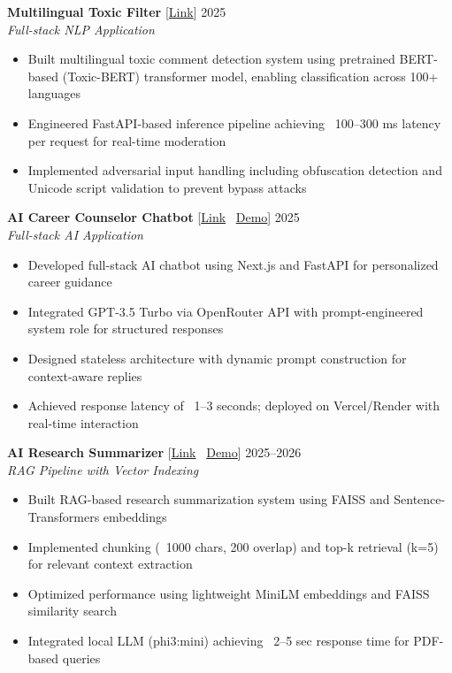 \documentclass[10pt,letterpaper]{article}
\begin{document}
\textbf{Multilingual Toxic Filter} [\href{https://github.com/PRakshithReddy17/multilingual-toxic-filter}{Link}] \hfill 2025\\
\textit{Full-stack NLP Application}
\begin{itemize}
    \item Built multilingual toxic comment detection system using pretrained BERT-based (Toxic-BERT) transformer model, enabling classification across 100+ languages
    \item Engineered FastAPI-based inference pipeline achieving ~100--300 ms latency per request for real-time moderation
    \item Implemented adversarial input handling including obfuscation detection and Unicode script validation to prevent bypass attacks
\end{itemize}

\textbf{AI Career Counselor Chatbot} [\href{https://github.com/PRakshithReddy17/ai-career-counselor-chatbot}{Link} \textbar\ \href{https://ai-career-counselor-chatbot.vercel.app}{Demo}] \hfill 2025\\
\textit{Full-stack AI Application}
\begin{itemize}
    \item Developed full-stack AI chatbot using Next.js and FastAPI for personalized career guidance
    \item Integrated GPT-3.5 Turbo via OpenRouter API with prompt-engineered system role for structured responses
    \item Designed stateless architecture with dynamic prompt construction for context-aware replies
    \item Achieved response latency of ~1--3 seconds; deployed on Vercel/Render with real-time interaction
\end{itemize}

\textbf{AI Research Summarizer} [\href{https://github.com/PRakshithReddy17/ai-research-summarizer}{Link} \textbar\ \href{https://ai-research-summarizer-self.vercel.app}{Demo}] \hfill 2025--2026\\
\textit{RAG Pipeline with Vector Indexing}
\begin{itemize}
    \item Built RAG-based research summarization system using FAISS and Sentence-Transformers embeddings
    \item Implemented chunking (~1000 chars, 200 overlap) and top-k retrieval (k=5) for relevant context extraction
    \item Optimized performance using lightweight MiniLM embeddings and FAISS similarity search
    \item Integrated local LLM (phi3:mini) achieving ~2--5 sec response time for PDF-based queries
\end{itemize}
\end{document}
